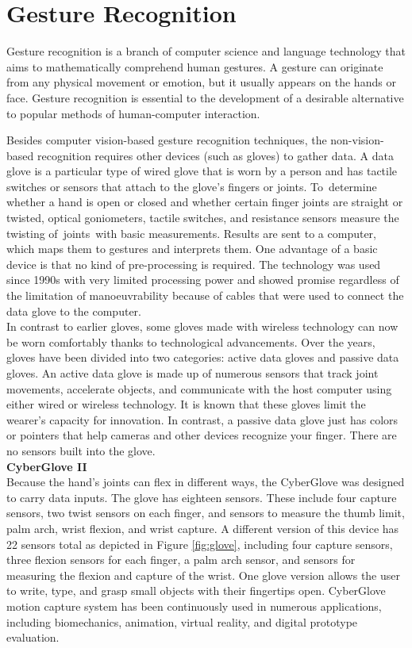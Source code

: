 \section{Gesture Recognition}
Gesture recognition is a branch of computer science and language technology that aims to mathematically comprehend human gestures. A gesture can originate from any physical movement or emotion, but it usually appears on the hands or face. \cite{smith2022hand} Gesture recognition is essential to the development of a desirable alternative to popular methods of human-computer interaction.

 Besides computer vision-based gesture recognition techniques, the non-vision-based recognition requires other devices (such as gloves) to gather data. \cite{bhuyan2017review}
A data glove is a particular type of wired glove that is worn by a person and has tactile switches or sensors that attach to the glove's fingers or joints. To determine whether a hand is open or closed and whether certain finger joints are straight or twisted, optical goniometers, tactile switches, and resistance sensors measure the twisting of joints with basic measurements. Results are sent to a computer, which maps them to gestures and interprets them. One advantage of a basic device is that no kind of pre-processing is required. The technology was used since 1990s with very limited processing power and showed promise  regardless of the limitation of manoeuvrability because of cables that were used to connect the data glove to the computer. \cite{premaratne2014human}
\\
In contrast to earlier gloves, some gloves made with wireless technology can now be worn comfortably thanks to technological advancements. Over the years, gloves have been divided into two categories: active data gloves and passive data gloves. An active data glove is made up of numerous sensors that track joint movements, accelerate objects, and communicate with the host computer using either wired or wireless technology. It is known that these gloves limit the wearer's capacity for innovation. In contrast, a passive data glove just has colors or pointers that help cameras and other devices recognize your finger. There are no sensors built into the glove.\\

\textbf{CyberGlove II}\label{txt:glove}\\
Because the hand's joints can flex in different ways, the CyberGlove was designed to carry data inputs. The glove has eighteen sensors. These include four capture sensors, two twist sensors on each finger, and sensors to measure the thumb limit, palm arch, wrist flexion, and wrist capture. A different version of this device has 22 sensors total  as depicted in Figure \ref{fig:glove}, including four capture sensors, three flexion sensors for each finger, a palm arch sensor, and sensors for measuring the flexion and capture of the wrist. One glove version allows the user to write, type, and grasp small objects with their fingertips open. CyberGlove motion capture system has been continuously used in numerous applications, including biomechanics, animation, virtual reality, and digital prototype evaluation.

